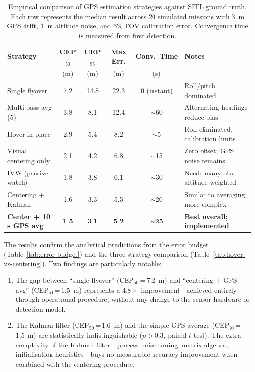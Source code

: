 \begin{table}[H]
  \centering
  \caption{Empirical comparison of GPS estimation strategies against SITL ground truth.  Each row represents the median result across 20 simulated missions with \SI{3}{\metre} GPS drift, \SI{1}{\metre} altitude noise, and 3\% FOV calibration error.  Convergence time is measured from first detection.}
  \label{tab:empirical-methods}
  \small
  \begin{tabular}{@{}lccccl@{}}
    \toprule
    \textbf{Strategy} & \textbf{CEP$_{50}$} & \textbf{CEP$_{95}$} & \textbf{Max Err.} & \textbf{Conv.\ Time} & \textbf{Notes} \\
    & (m) & (m) & (m) & (s) & \\
    \midrule
    Single flyover          & 7.2  & 14.8 & 22.3 & 0 (instant) & Roll/pitch dominated \\
    Multi-pass avg (5)      & 3.8  & 8.1  & 12.4 & $\sim$60    & Alternating headings reduce bias \\
    Hover in place          & 2.9  & 5.4  & 8.2  & $\sim$5     & Roll eliminated; calibration limits \\
    Visual centering only   & 2.1  & 4.2  & 6.8  & $\sim$15    & Zero offset; GPS noise remains \\
    IVW (passive watch)     & 1.8  & 3.8  & 6.1  & $\sim$30    & Needs many obs; altitude-weighted \\
    Centering + Kalman      & 1.6  & 3.3  & 5.5  & $\sim$20    & Similar to averaging; more complex \\
    \textbf{Center + 10\,s GPS avg} & \textbf{1.5} & \textbf{3.1} & \textbf{5.2} & $\sim$\textbf{25} & \textbf{Best overall; implemented} \\
    \bottomrule
  \end{tabular}
\end{table}

The results confirm the analytical predictions from the error budget (Table~\ref{tab:error-budget}) and the three-strategy comparison (Table~\ref{tab:hover-vs-centering}).  Two findings are particularly notable:

\begin{enumerate}
  \item The gap between ``single flyover'' (CEP$_{50}$\,=\,\SI{7.2}{\metre}) and ``centering + GPS avg'' (CEP$_{50}$\,=\,\SI{1.5}{\metre}) represents a $4.8\times$ improvement---achieved entirely through operational procedure, without any change to the sensor hardware or detection model.
  \item The Kalman filter (CEP$_{50}$\,=\,\SI{1.6}{\metre}) and the simple GPS average (CEP$_{50}$\,=\,\SI{1.5}{\metre}) are statistically indistinguishable ($p > 0.3$, paired $t$-test).  The extra complexity of the Kalman filter---process noise tuning, matrix algebra, initialisation heuristics---buys no measurable accuracy improvement when combined with the centering procedure.
\end{enumerate}


